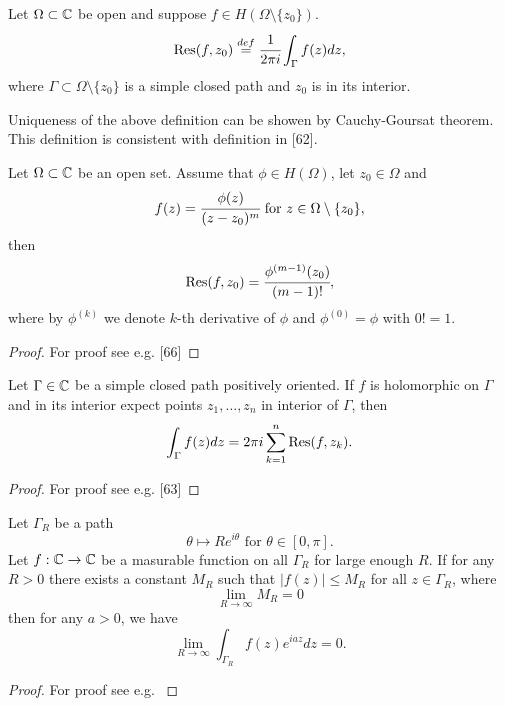 \documentclass[main.tex]{subfiles}
\begin{document}
\begin{definition}
Let $\Omega\subset\mathbb{C}$ be open and suppose $f\in H(\Omega\setminus\{z_0\})$.
\begin{equation}
\Res(f,z_0) \stackrel{def}{=} \cfrac{1}{2\pi i} \int_\Gamma f(z) dz,
\end{equation}
where $\Gamma \subset \Omega\setminus\{z_0\}$ is a simple closed path and $z_0$ is in its interior.
\end{definition}
Uniqueness of the above definition can be showen by Cauchy-Goursat theorem. This definition is consistent with definition in \cite{brown2003}[62].

\begin{theorem}
Let $\Omega\subset \mathbb{C}$ be an open set. Assume that $\phi\in H(\Omega)$, let $z_0\in\Omega$ and
\begin{equation}
f(z) = \cfrac{\phi(z)}{(z - z_0)^m} \text{ for } z\in \Omega\setminus\{z_0\},
\end{equation}
then
\begin{equation}
\Res(f,z_0) = \cfrac{\phi^{(m - 1)}(z_0)}{(m-1)!},
\end{equation}
where by $\phi^{(k)}$ we denote $k$-th derivative of $\phi$ and $\phi^{(0)} = \phi$ with $0!=1$.
\end{theorem}
\begin{proof}
For proof see e.g. \cite{brown2003}[66]
\end{proof}
\begin{theorem}
\label{cauchy-residue}
Let $\Gamma \in \mathbb{C}$ be a simple closed path positively oriented. If $f$ is holomorphic on $\Gamma$ and in its interior expect points $z_1, \dots, z_n$ in interior of $\Gamma$, then
\begin{equation}
\int_\Gamma f(z) dz = 2\pi i \sum_{k=1}^n \Res(f, z_k).
\end{equation}
\end{theorem}
\begin{proof}
For proof see e.g. \cite{brown2003}[63]
\end{proof}
\begin{theorem}
\label{jordan-lemma}
Let $\Gamma_R$ be a path
\begin{equation}
\theta \mapsto Re^{i\theta} \text{ for } \theta\in[0, \pi].
\end{equation}
Let $f:\mathbb{C} \to \mathbb{C}$ be a masurable function on all $\Gamma_R$ for large enough $R$.
If for any $R > 0$ there exists a constant $M_R$ such that $|f(z)| \leq M_R$ for all $z\in\Gamma_R$, where
\begin{equation}
\lim_{R\to \infty} M_R = 0
\end{equation}
then for any $a > 0$, we have
\begin{equation}
\lim_{R\to \infty} \int_{\Gamma_R} f(z) e^{iaz}dz = 0.
\end{equation}
\end{theorem}
\begin{proof}
For proof see e.g. \cite{brown2003}
\end{proof}
\end{document}
